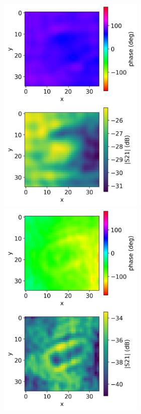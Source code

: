\documentclass[11pt,a4paper,uplatex]{ujarticle}
\begin{document}
  \begin{figure}[tbp]
    \begin{minipage}[b]{0.495\textwidth}
      \centering
      \includegraphics[keepaspectratio, width=70mm]{Images/python/rowdata/30.png}
    \end{minipage}
    \begin{minipage}[b]{0.495\textwidth}
      \centering
      \includegraphics[keepaspectratio, width=70mm]{Images/python/rowdata/80.png}
    \end{minipage}\\

\end{figure}
\end{document}

